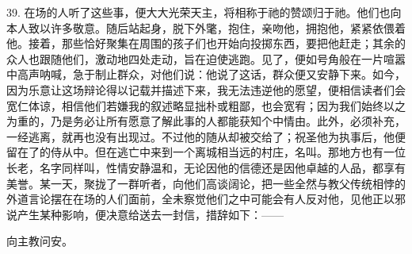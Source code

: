 39. 在场的人听了这些事，便大大光荣天主，将相称于祂的赞颂归于祂。他们也向本人致以许多敬意。随后站起身，脱下外氅，抱住，亲吻他，拥抱他，紧紧依偎着他。接着，那些恰好聚集在周围的孩子们也开始向投掷东西，要把他赶走；其余的众人也跟随他们，激动地四处走动，旨在迫使逃跑。见了，便如号角般在一片喧嚣中高声呐喊，急于制止群众，对他们说：他说了这话，群众便又安静下来。如今，因为乐意让这场辩论得以记载并描述下来，我无法违逆他的愿望，便相信读者们会宽仁体谅，相信他们若嫌我的叙述略显拙朴或粗鄙，也会宽宥；因为我们始终以之为重的，乃是务必让所有愿意了解此事的人都能获知个中情由。此外，必须补充，一经逃离，就再也没有出现过。不过他的随从却被交给了；祝圣他为执事后，他便留在了的侍从中。但在逃亡中来到一个离城相当远的村庄，名叫。那地方也有一位长老，名字同样叫，性情安静温和，无论因他的信德还是因他卓越的人品，都享有美誉。某一天，聚拢了一群听者，向他们高谈阔论，把一些全然与教父传统相悖的外道言论摆在在场的人们面前，全未察觉他们之中可能会有人反对他，见他正以邪说产生某种影响，便决意给送去一封信，措辞如下：——\par

向主教问安。\par

